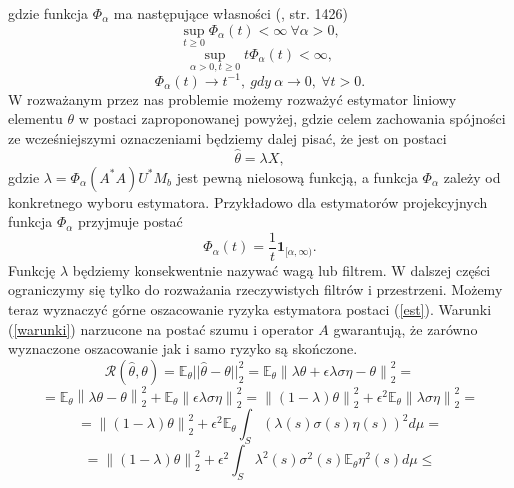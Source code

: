 \documentclass{mwart}
\newcommand{\norm}[1]{\left\lVert#1\right\rVert}
\begin{document}
gdzie funkcja $\Phi_{\alpha}$ ma następujące własności (\cite{mair}, str. 1426)
\begin{displaymath}
\sup_{t\geq 0}\Phi_{\alpha}(t)<\infty\ \forall \alpha>0,
\end{displaymath}
\begin{displaymath}
\sup_{\alpha>0,t\geq 0}t\Phi_{\alpha}(t)<\infty,
\end{displaymath}
\begin{displaymath}
\Phi_{\alpha}(t)\to t^{-1},\ gdy\  \alpha\to 0,\ \forall t>0.
\end{displaymath}
W rozważanym przez nas problemie możemy rozważyć estymator liniowy elementu $\theta$ w postaci zaproponowanej powyżej, gdzie celem zachowania spójności ze wcześniejszymi oznaczeniami będziemy dalej pisać, że jest on postaci
\begin{equation}\label{est}
\hat{\theta}=\lambda X,
\end{equation}
gdzie $\lambda=\Phi_{\alpha}(A^*A)U^*M_b$ jest pewną nielosową funkcją, a funkcja $\Phi_{\alpha}$ zależy od konkretnego wyboru estymatora. Przykładowo dla estymatorów projekcyjnych funkcja $\Phi_{\alpha}$ przyjmuje postać
\begin{displaymath}
\Phi_{\alpha}(t)=\frac{1}{t}\pmb{1}_{[\alpha,\infty)}.
\end{displaymath}
Funkcję $\lambda$ będziemy konsekwentnie nazywać wagą lub filtrem. W dalszej części ograniczymy się tylko do rozważania rzeczywistych filtrów i przestrzeni. Możemy teraz wyznaczyć górne oszacowanie ryzyka estymatora postaci (\ref{est}). Warunki (\ref{warunki}) narzucone na postać szumu i operator $A$ gwarantują, że zarówno wyznaczone oszacowanie jak i samo ryzyko są skończone.
\begin{displaymath}
\mathcal{R}(\hat{\theta},\theta )= \mathbb{E}_{\theta}||\hat{\theta}-\theta||_2^2=\mathbb{E}_{\theta}\norm{\lambda\theta+\epsilon\lambda\sigma\eta-\theta}^2_2=
\end{displaymath}
\begin{displaymath}
=\mathbb{E}_{\theta}\norm{\lambda\theta-\theta}^2_2+\mathbb{E}_{\theta}\norm{\epsilon\lambda\sigma\eta}^2_2=\norm{(1-\lambda)\theta}_2^2+\epsilon^2\mathbb{E}_{\theta}\norm{\lambda\sigma\eta}_2^2=
\end{displaymath}
\begin{displaymath}
=\norm{(1-\lambda)\theta}_2^2+\epsilon^2\mathbb{E}_{\theta}\int_S\left(\lambda(s)\sigma(s)\eta(s)\right)^2d\mu=
\end{displaymath}
\begin{displaymath}
=\norm{(1-\lambda)\theta}_2^2+\epsilon^2\int_S\lambda^2(s)\sigma^2(s)\mathbb{E}_{\theta}\eta^2(s)d\mu\leq 
\end{displaymath}
\end{document}
